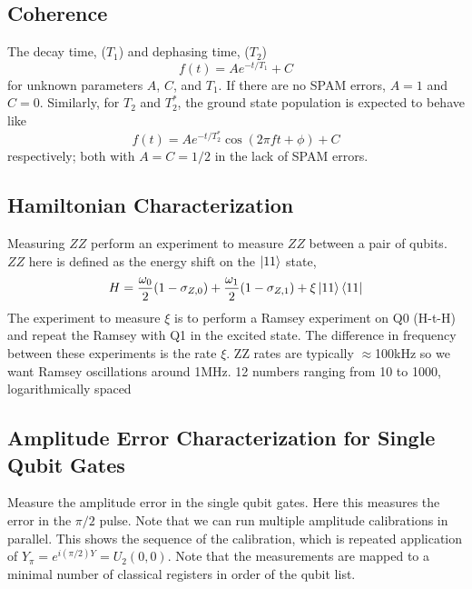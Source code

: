 \documentclass[11pt, oneside]{article}   	%
\begin{document}
\subsection{Coherence}
The decay time,  ($T_1$) and dephasing time,  ($T_2$) 
\begin{equation}
f(t) = A e^{- t/T_1} + C
\end{equation}
for unknown parameters $A$, $C$, and $T_1$. 
If there are no SPAM errors,  $A = 1$ and $C = 0$.
Similarly, for $T_2$ and $T^*_2$,  the ground state population is expected to behave like
\begin{equation}
f(t) = A e^{- t/T^*_2} \cos( 2\pi f t + \phi ) + C
\end{equation}
respectively; both with $A = C = 1/2$ in the lack of SPAM errors.

\subsection{Hamiltonian Characterization}
Measuring $ZZ$
perform an experiment to measure $ZZ$ between a pair of qubits. 
$ZZ$ here is defined as the energy shift on the $\ket{11}$ state,
\begin{equation}
H = \frac{\omega_0}{2} (1 - \sigma_{Z, 0}) + \frac{\omega_1}{2} (1 - \sigma_{Z, 1}) + \xi \ket{11} \bra{11}
\end{equation}
The experiment to measure $\xi$ is to perform a Ramsey experiment on Q0 (H-t-H) and repeat the Ramsey with Q1 in the excited state. 
The difference in frequency between these experiments is the rate $\xi$. 
ZZ rates are typically $\approx$100kHz so we want Ramsey oscillations around 1MHz.
12 numbers ranging from 10 to 1000, logarithmically spaced

\subsection{Amplitude Error Characterization for Single Qubit Gates}
Measure the amplitude error in the single qubit gates. 
Here this measures the error in the $\pi/2$ pulse. 
Note that we can run multiple amplitude calibrations in parallel. 
This shows the sequence of the calibration, which is repeated application of $Y_{\pi} = e^{i (\pi/2) Y} = U_2(0, 0)$. 
Note that the measurements are mapped to a minimal number of classical registers in order of the qubit list.
\end{document}
